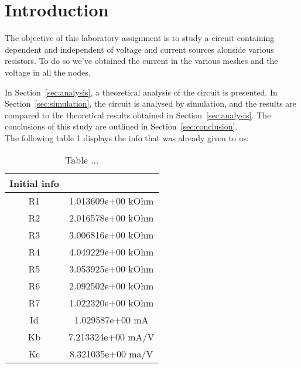 \newpage
\section{Introduction}
\label{sec:introduction}

The objective of this laboratory assignment is to study a circuit containing dependent and independent of voltage and current sources alonside various resistors. To do so we've obtained the current in the various meshes and the voltage in all the nodes.

In Section~\ref{sec:analysis}, a theoretical analysis of the circuit is
presented. In Section~\ref{sec:simulation}, the circuit is analysed by
simulation, and the results are compared to the theoretical results obtained in
Section~\ref{sec:analysis}. The conclusions of this study are outlined in
Section~\ref{sec:conclusion}. \\
\newline
The following table 1 displays the info that was already given to us:

\begin{table}
\centering
\begin{tabular}{c|c} 
 \hline
Initial info\\ [0.5ex] 
 \hline\hline
R1 & 1.013609e+00 kOhm\\ \hline
R2 & 2.016578e+00 kOhm\\ \hline
R3 & 3.006816e+00 kOhm\\ \hline
R4 & 4.049229e+00 kOhm\\ \hline
R5 & 3.053925e+00 kOhm\\ \hline
R6 & 2.092502e+00 kOhm\\ \hline
R7 & 1.022320e+00 kOhm\\ \hline
Id & 1.029587e+00 mA\\ \hline
Kb & 7.213324e+00 mA/V\\ \hline
Kc & 8.321035e+00 ma/V\\ \hline 
\end{tabular}
\caption{Table ...}
\label{table:1}
\end{table}





